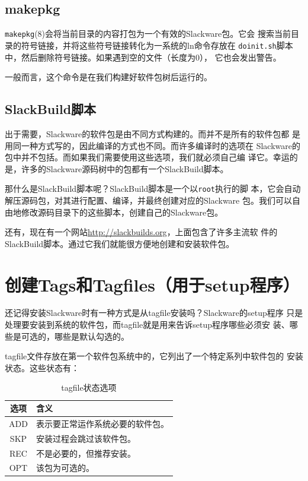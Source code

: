 \subsection{makepkg}
\label{sec:packageManagement:makingPackages:makepkg}
\texttt{makepkg}(8)会将当前目录的内容打包为一个有效的Slackware包。它会
搜索当前目录的符号链接，并将这些符号链接转化为一系统的ln命令存放在
\texttt{doinit.sh}脚本中，然后删除符号链接。如果遇到空的文件（长度为0），
它也会发出警告。

一般而言，这个命令是在我们构建好软件包树后运行的。

\subsection{SlackBuild脚本}
\label{sec:packageManagement:makingPackages:slackbuild}
出于需要，Slackware的软件包是由不同方式构建的。而并不是所有的软件包都
是用同一种方式写的，因此编译的方式也不同。而许多编译时的选项在
Slackware的包中并不包括。而如果我们需要使用这些选项，我们就必须自己编
译它。幸运的是，许多的Slackware源码树中的包都有一个SlackBuild脚本。

那什么是SlackBuild脚本呢？SlackBuild脚本是一个以\texttt{root}执行的脚
本，它会自动解压源码包，对其进行配置、编译，并最终创建对应的Slackware
包。我们可以自由地修改源码目录下的这些脚本，创建自己的Slackware包。

还有，现在有一个网站\url{http://slackbuilds.org}，上面包含了许多主流软
件的SlackBuild脚本。通过它我们就能很方便地创建和安装软件包。

\section{创建Tags和Tagfiles（用于setup程序）}
\label{sec:packageManagement:tagfile}
还记得安装Slackware时有一种方式是从tagfile安装吗？Slackware的setup程序
只是处理要安装到系统的软件包，而tagfile就是用来告诉setup程序哪些必须安
装、哪些是可选的，哪些是默认勾选的。

tagfile文件存放在第一个软件包系统中的，它列出了一个特定系列中软件包的
安装状态。这些状态有：
\begin{table}[htpb]
  \centering
  \begin{tabular}{c|l}
    \hline \hline
    选项 & 含义 \\ \hline
    ADD & 表示要正常运作系统必要的软件包。\\
    SKP & 安装过程会跳过该软件包。\\
    REC & 不是必要的，但推荐安装。\\
    OPT & 该包为可选的。\\
    \hline\hline
  \end{tabular}
  \caption{tagfile状态选项}
  \label{tab:tagfile-options}
\end{table}

